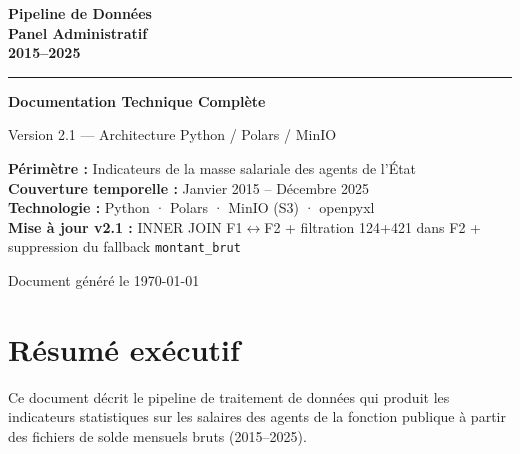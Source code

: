 \documentclass[12pt,a4paper,french]{report}
\begin{document}
\begin{titlepage}
  \centering
  \vspace*{2cm}
  {\huge\bfseries\color{primaryblue}
    Pipeline de Données\\[0.4em]
    Panel Administratif\\[0.4em]
    2015--2025
  \par}
  \vspace{1.5cm}
  \textcolor{accentblue}{\rule{10cm}{2pt}}
  \vspace{1cm}

  {\Large\bfseries Documentation Technique Complète\par}
  \vspace{0.5cm}
  {\large Version 2.1 — Architecture Python / Polars / MinIO\par}
  \vspace{2cm}

  \begin{tcolorbox}[colback=lightblue!40, colframe=primaryblue, width=12cm]
    \centering
    \textbf{Périmètre :} Indicateurs de la masse salariale des agents de l'État\\[4pt]
    \textbf{Couverture temporelle :} Janvier 2015 -- Décembre 2025\\[4pt]
    \textbf{Technologie :} Python · Polars · MinIO (S3) · openpyxl\\[4pt]
    \textbf{Mise à jour v2.1 :} INNER JOIN F1$\leftrightarrow$F2 +
    filtration 124+421 dans F2 + suppression du fallback \texttt{montant\_brut}
  \end{tcolorbox}

  \vfill
  {\small\color{darkgray} Document généré le \today\par}
\end{titlepage}

\tableofcontents
\newpage

\chapter{Résumé exécutif}

Ce document décrit le pipeline de traitement de données qui produit les
indicateurs statistiques sur les salaires des agents de la fonction publique
à partir des fichiers de solde mensuels bruts (2015--2025).
\end{document}
